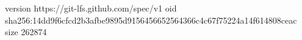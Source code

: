 version https://git-lfs.github.com/spec/v1
oid sha256:14dd9f6cfcd2b3afbe9895d9156456652564366c4c67f75224a14f614808ceac
size 262874
